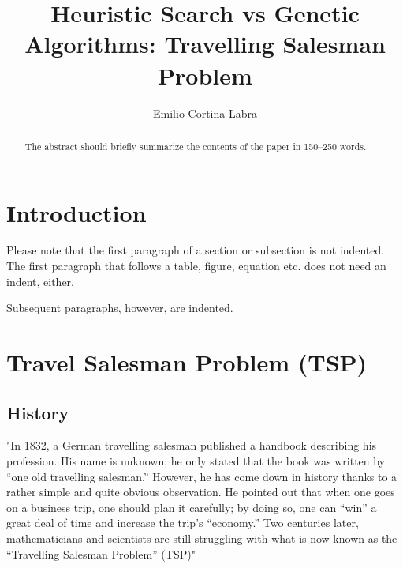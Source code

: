 \documentclass[runningheads]{llncs}
\begin{document}
%
\title{Heuristic Search vs Genetic Algorithms: Travelling Salesman Problem}
%
%
\author{Emilio Cortina Labra \\
}
%
%
%
\maketitle              %
%
\begin{abstract}
The abstract should briefly summarize the contents of the paper in
150--250 words.

\end{abstract}
%
%
%
\section{Introduction}
Please note that the first paragraph of a section or subsection is
not indented. The first paragraph that follows a table, figure,
equation etc. does not need an indent, either.

Subsequent paragraphs, however, are indented.

%
%
%
\section{Travel Salesman Problem (TSP)}
\subsection{History}
"In 1832, a German travelling salesman published a handbook describing his profession. His name is unknown; he only stated that the book was written by “one old travelling salesman.” However, he has come down in history thanks to a rather simple and quite obvious observation. He pointed out that when one goes on a business trip, one should plan it carefully; by doing so, one can “win” a great deal of time and increase the trip’s “economy.” Two centuries later, mathematicians and scientists are still struggling with what is now known as the “Travelling Salesman Problem” (TSP)"~\cite{ref_article_bridgew}
\end{document}
